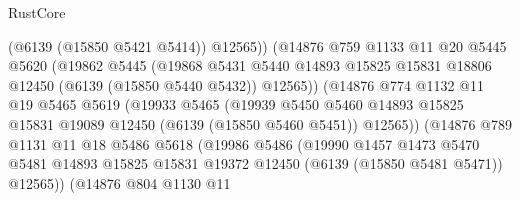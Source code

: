\begin{lexlean}{RustCore}
\begin{coremodule}
                              (@6139 (@15850 @5421 @5414))
                              @12565))
                          (@14876
                            @759
                            @1133
                            @11
                            @20
                            @5445
                            @5620
                            (@19862
                              @5445
                              (@19868
                                @5431
                                @5440
                                @14893
                                @15825
                                @15831
                                @18806
                                @12450
                                (@6139 (@15850 @5440 @5432))
                                @12565))
                            (@14876
                              @774
                              @1132
                              @11
                              @19
                              @5465
                              @5619
                              (@19933
                                @5465
                                (@19939
                                  @5450
                                  @5460
                                  @14893
                                  @15825
                                  @15831
                                  @19089
                                  @12450
                                  (@6139 (@15850 @5460 @5451))
                                  @12565))
                              (@14876
                                @789
                                @1131
                                @11
                                @18
                                @5486
                                @5618
                                (@19986
                                  @5486
                                  (@19990
                                    @1457
                                    @1473
                                    @5470
                                    @5481
                                    @14893
                                    @15825
                                    @15831
                                    @19372
                                    @12450
                                    (@6139 (@15850 @5481 @5471))
                                    @12565))
                                (@14876
                                  @804
                                  @1130
                                  @11

\end{coremodule}
\end{lexlean}
